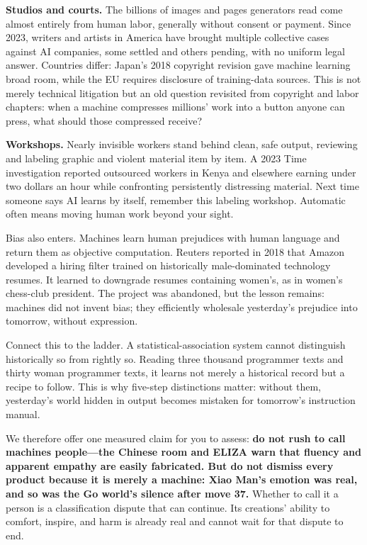 \textbf{Studios and courts.} The billions of images and pages generators read come almost entirely from human labor, generally without consent or payment. Since 2023, writers and artists in America have brought multiple collective cases against AI companies, some settled and others pending, with no uniform legal answer. Countries differ: Japan's 2018 copyright revision gave machine learning broad room, while the EU requires disclosure of training-data sources. This is not merely technical litigation but an old question revisited from copyright and labor chapters: when a machine compresses millions' work into a button anyone can press, what should those compressed receive?

\textbf{Workshops.} Nearly invisible workers stand behind clean, safe output, reviewing and labeling graphic and violent material item by item. A 2023 Time investigation reported outsourced workers in Kenya and elsewhere earning under two dollars an hour while confronting persistently distressing material. Next time someone says AI learns by itself, remember this labeling workshop. Automatic often means moving human work beyond your sight.

Bias also enters. Machines learn human prejudices with human language and return them as objective computation. Reuters reported in 2018 that Amazon developed a hiring filter trained on historically male-dominated technology resumes. It learned to downgrade resumes containing women's, as in women's chess-club president. The project was abandoned, but the lesson remains: machines did not invent bias; they efficiently wholesale yesterday's prejudice into tomorrow, without expression.

Connect this to the ladder. A statistical-association system cannot distinguish historically so from rightly so. Reading three thousand programmer texts and thirty woman programmer texts, it learns not merely a historical record but a recipe to follow. This is why five-step distinctions matter: without them, yesterday's world hidden in output becomes mistaken for tomorrow's instruction manual.

We therefore offer one measured claim for you to assess: \textbf{do not rush to call machines people---the Chinese room and ELIZA warn that fluency and apparent empathy are easily fabricated. But do not dismiss every product because it is merely a machine: Xiao Man's emotion was real, and so was the Go world's silence after move 37.} Whether to call it a person is a classification dispute that can continue. Its creations' ability to comfort, inspire, and harm is already real and cannot wait for that dispute to end.

